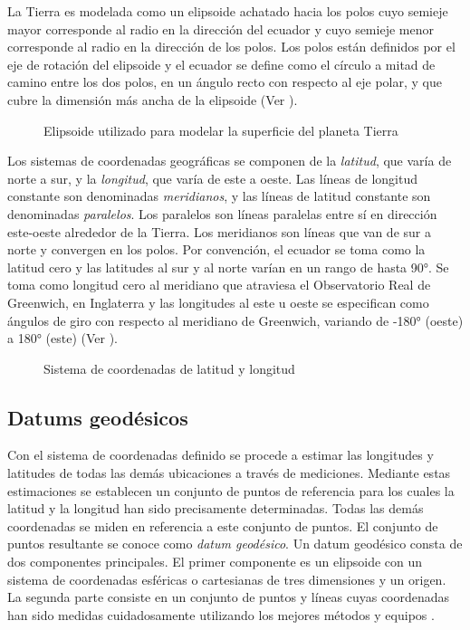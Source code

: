La Tierra es modelada como un elipsoide achatado hacia los polos cuyo semieje mayor corresponde al radio en la dirección del ecuador y cuyo semieje menor corresponde al radio en la dirección de los polos. Los polos están definidos por el eje de rotación del elipsoide y el ecuador se define como el círculo a mitad de camino entre los dos polos, en un ángulo recto con respecto al eje polar, y que cubre la dimensión más ancha de la elipsoide (Ver ).

\begin{figure}[h]
	\centering
	
	\caption[Elipsoide que modela la superficie de la Tierra]{Elipsoide utilizado para modelar la superficie del planeta Tierra}
	\label{fig:elipsoide} 
\end{figure}

Los sistemas de coordenadas geográficas se componen de la \emph{latitud}, que varía de norte a sur, y la \emph{longitud}, que varía de este a oeste. Las líneas de longitud constante son denominadas \emph{meridianos}, y las líneas de latitud constante son denominadas \emph{paralelos}. Los paralelos son líneas paralelas entre sí en dirección este-oeste alrededor de la Tierra. Los meridianos son líneas que van de sur a norte y convergen en los polos. Por convención, el ecuador se toma como la latitud cero y las latitudes al sur y al norte varían en un rango de hasta 90°. Se toma como longitud cero al meridiano que atraviesa el Observatorio Real de Greenwich, en Inglaterra y las longitudes al este u oeste se especifican como ángulos de giro con respecto al meridiano de Greenwich, variando de -180° (oeste) a 180° (este) (Ver ).

\begin{figure}[h]
	\centering
	
	\caption[Sistema de coordenadas de latitud y longitud]{Sistema de coordenadas de latitud y longitud}
	\label{fig:coordenadas} 
\end{figure}

\subsection{Datums geodésicos}


Con el sistema de coordenadas definido se procede a estimar las longitudes y latitudes de todas las demás ubicaciones a través de mediciones. Mediante estas estimaciones se establecen un conjunto de puntos de referencia para los cuales la latitud y la longitud han sido precisamente determinadas. Todas las demás coordenadas se miden en referencia a este conjunto de puntos. El conjunto de puntos resultante se conoce como \emph{datum geodésico}.  Un datum geodésico consta de dos componentes principales. El primer componente es un elipsoide con un sistema de coordenadas esféricas o cartesianas de tres dimensiones y un origen. La segunda parte consiste en un conjunto de puntos y líneas cuyas coordenadas han sido medidas cuidadosamente utilizando los mejores métodos y equipos \citep{bolstad2005gis}.

